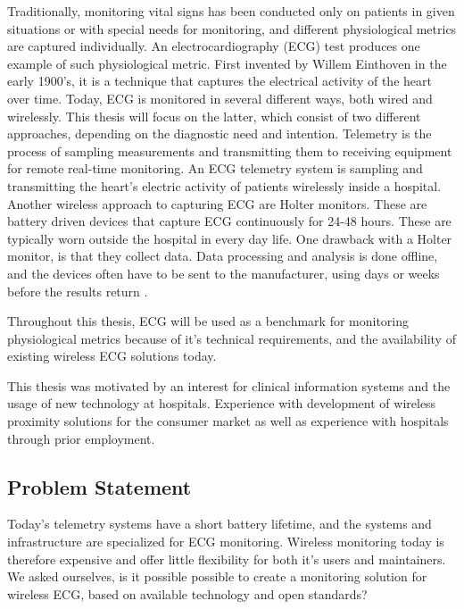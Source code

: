 \noindent Traditionally, monitoring vital signs has been conducted only on patients in given situations or with special needs for monitoring, and different physiological metrics are captured individually. An electrocardiography (ECG) test produces one example of such physiological metric. First invented by Willem Einthoven in the early 1900's, it is a technique that captures the electrical activity of the heart over time. Today, ECG is monitored in several different ways, both wired and wirelessly. This thesis will focus on the latter, which consist of two different approaches, depending on the diagnostic need and intention. Telemetry is the process of sampling measurements and transmitting them to receiving equipment for remote real-time monitoring. An ECG telemetry system is sampling and transmitting the heart's electric activity of patients wirelessly inside a hospital. Another wireless approach to capturing ECG are Holter monitors. These are battery driven devices that capture ECG continuously for 24-48 hours. These are typically worn outside the hospital in every day life. One drawback with a Holter monitor, is that they collect data. Data processing and analysis is done offline, and the devices often have to be sent to the manufacturer, using days or weeks before the results return \cite{ziopatch:14}.

Throughout this thesis, ECG will be used as a benchmark for monitoring physiological metrics because of it's technical requirements, and the availability of existing wireless ECG solutions today.


This thesis was motivated by an interest for clinical information systems and the usage of new technology at hospitals. Experience with development of wireless proximity solutions for the consumer market as well as experience with hospitals through prior employment.


\subsection{Problem Statement} 
\label{sub:problem_statement}

Today's telemetry systems have a short battery lifetime, and the systems and infrastructure are specialized for ECG monitoring. Wireless monitoring today is therefore expensive and offer little flexibility for both it's users and maintainers. We asked ourselves, is it possible possible to create a monitoring solution for wireless ECG, based on available technology and open standards? 

